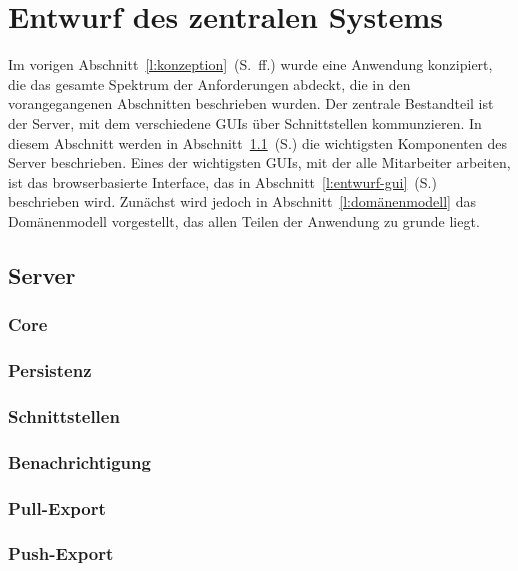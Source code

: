 \section{Entwurf des zentralen Systems}\label{l:entwurf}

Im vorigen Abschnitt~\ref{l:konzeption}~(S.\pageref{l:konzeption}~ff.) wurde eine Anwendung konzipiert, die das gesamte Spektrum der Anforderungen abdeckt, die in den vorangegangenen Abschnitten beschrieben wurden. Der zentrale Bestandteil ist der Server, mit dem verschiedene GUIs über Schnittstellen kommunzieren. In diesem Abschnitt werden in Abschnitt~\ref{l:entwurf-server}~(S.\pageref{l:entwurf-server}) die wichtigsten Komponenten des Server beschrieben. Eines der wichtigsten GUIs, mit der alle Mitarbeiter arbeiten, ist das browserbasierte Interface, das in Abschnitt~\ref{l:entwurf-gui}~(S.\pageref{l:entwurf-gui}) beschrieben wird. Zunächst wird jedoch in Abschnitt~\ref{l:domänenmodell} das Domänenmodell vorgestellt, das allen Teilen der Anwendung zu grunde liegt.



\subsection{Server}\label{l:entwurf-server}

\subsubsection{Core}

\subsubsection{Persistenz}

\subsubsection{Schnittstellen}

\subsubsection{Benachrichtigung}

\subsubsection{Pull-Export}

\subsubsection{Push-Export}

